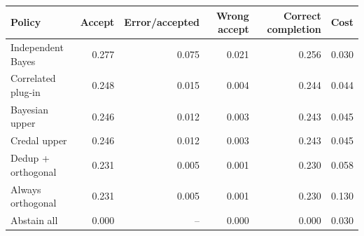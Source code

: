 \begin{tabular}{@{}lrrrrr@{}}
\toprule
Policy & Accept & Error/accepted & Wrong accept & Correct completion & Cost\\
\midrule
Independent Bayes & 0.277 & 0.075 & 0.021 & 0.256 & 0.030\\
Correlated plug-in & 0.248 & 0.015 & 0.004 & 0.244 & 0.044\\
Bayesian upper & 0.246 & 0.012 & 0.003 & 0.243 & 0.045\\
Credal upper & 0.246 & 0.012 & 0.003 & 0.243 & 0.045\\
Dedup + orthogonal & 0.231 & 0.005 & 0.001 & 0.230 & 0.058\\
Always orthogonal & 0.231 & 0.005 & 0.001 & 0.230 & 0.130\\
Abstain all & 0.000 & -- & 0.000 & 0.000 & 0.030\\
\bottomrule
\end{tabular}
